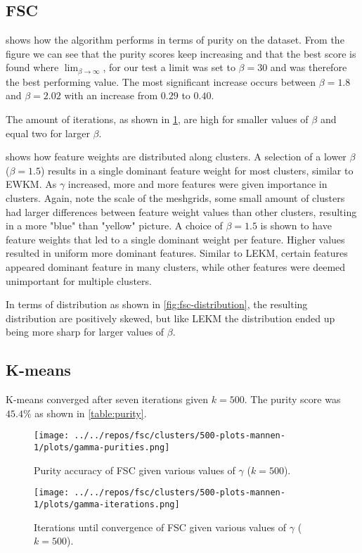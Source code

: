 \documentclass[../report.tex]{subfiles}
\begin{document}
\subsection{FSC}
 shows how the algorithm performs in terms of purity on the dataset. From the figure we can see that the purity scores keep increasing and that the best score is found where $\lim_{\beta \to{\infty}}$, for our test a limit was set to $\beta=30$ and was therefore the best performing value. The most significant increase occurs between $\beta=1.8$ and $\beta=2.02$ with an increase from $0.29$ to $0.40$.

The amount of iterations, as shown in \cref{fig:fsc-iterations}, are high for smaller values of $\beta$ and equal two for larger $\beta$.

 shows how feature weights are distributed along clusters. A selection of a lower $\beta$ ($\beta=1.5$) results in a single dominant feature weight for most clusters, similar to EWKM. As $\gamma$ increased, more and more features were given importance in clusters. Again, note the scale of the meshgrids, some small amount of clusters had larger differences between feature weight values than other clusters, resulting in a more "blue" than "yellow" picture. A choice of $\beta=1.5$ is shown to have feature weights that led to a single dominant weight per feature. Higher values resulted in uniform more dominant features. Similar to LEKM, certain features appeared dominant feature in many clusters, while other features were deemed unimportant for multiple clusters.

In terms of distribution as shown in \cref{fig:fsc-distribution}, the resulting distribution are positively skewed, but like LEKM the distribution ended up being more sharp for larger values of $\beta$.

\subsection{K-means}
K-means converged after seven iterations given $k=500$. The purity score was $45.4\%$ as shown in \cref{table:purity}.

\begin{frame}

\begin{figure}
\begin{minipage}{.45\textwidth}
  \texttt{[image: ../../repos/fsc/clusters/500-plots-mannen-1/plots/gamma-purities.png]}
  \caption{Purity accuracy of FSC given various values of $\gamma$ ($k=500$).}
  \label{fig:fsc-purity}
\end{minipage}\hfill
\begin{minipage}{.45\textwidth}
  \texttt{[image: ../../repos/fsc/clusters/500-plots-mannen-1/plots/gamma-iterations.png]}
  \caption{Iterations until convergence of FSC given various values of $\gamma$ ($k=500$).}
  \label{fig:fsc-iterations}
\end{minipage}
\end{figure}
\end{frame}
\end{document}
